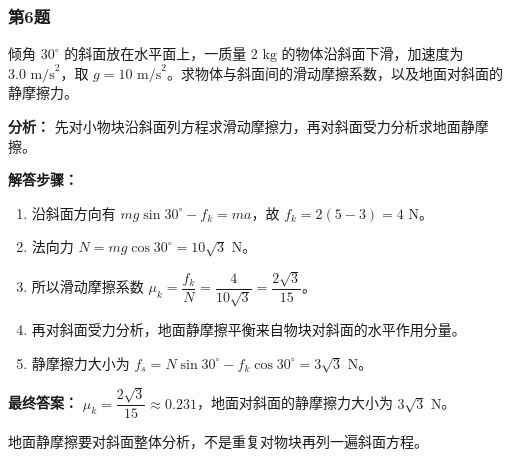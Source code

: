 \documentclass[12pt,a4paper]{ctexart}
\begin{document}
\subsubsection*{第6题}
\begin{tcolorbox}[colback=gray!2!white,colframe=black!60,title={题目}]
倾角 \(30^\circ\) 的斜面放在水平面上，一质量 \(2\text{ kg}\) 的物体沿斜面下滑，加速度为 \(3.0\text{ m/s}^2\)，取 \(g=10\text{ m/s}^2\)。求物体与斜面间的滑动摩擦系数，以及地面对斜面的静摩擦力。\par
\end{tcolorbox}
\begin{tcolorbox}[colback=blue!2!white,colframe=blue!55!black,title={完整答案}]
\textbf{分析：}
先对小物块沿斜面列方程求滑动摩擦力，再对斜面受力分析求地面静摩擦。\par
\textbf{解答步骤：}
\begin{enumerate}
\item 沿斜面方向有 \(mg\sin30^\circ-f_k=ma\)，故 \(f_k=2(5-3)=4\text{ N}\)。
\item 法向力 \(N=mg\cos30^\circ=10\sqrt3\text{ N}\)。
\item 所以滑动摩擦系数 \(\mu_k=\dfrac{f_k}{N}=\dfrac{4}{10\sqrt3}=\dfrac{2\sqrt3}{15}\)。
\item 再对斜面受力分析，地面静摩擦平衡来自物块对斜面的水平作用分量。
\item 静摩擦力大小为 \(f_s=N\sin30^\circ-f_k\cos30^\circ=3\sqrt3\text{ N}\)。
\end{enumerate}
\textbf{最终答案：}
\(\mu_k=\dfrac{2\sqrt3}{15}\approx 0.231\)，地面对斜面的静摩擦力大小为 \(3\sqrt3\text{ N}\)。\par
\end{tcolorbox}
\begin{tcolorbox}[colback=red!2!white,colframe=red!55!black,title={易错点}]
地面静摩擦要对斜面整体分析，不是重复对物块再列一遍斜面方程。\par
\end{tcolorbox}
\end{document}
